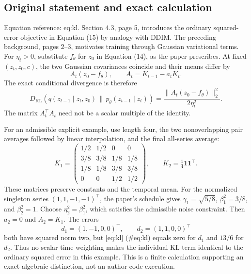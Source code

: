 \documentclass[10pt]{article}
\begin{document}
\subsection*{Original statement and exact calculation}
Equation reference: eq:kl. Section 4.3, page 5, introduces the ordinary squared-error objective in Equation (15) by analogy with DDIM. The preceding background, pages 2–3, motivates training through Gaussian variational terms. For \(\eta_t>0\), substitute \(f_\theta\) for \(z_0\) in Equation (14), as the paper prescribes. At fixed \((z_t,z_0,c)\), the two Gaussian covariances coincide and their means differ by \[A_t(z_0-f_\theta),\qquad A_t=K_{t-1}-a_tK_t.\] The exact conditional divergence is therefore \[
D_{\mathrm{KL}}\!\left(q(z_{t-1}\mid z_t,z_0)
 \,\|\,p_\theta(z_{t-1}\mid z_t)\right)
=\frac{\|A_t(z_0-f_\theta)\|_2^2}{2\eta_t^2}.\] The matrix \(A_t^\top A_t\) need not be a scalar multiple of the identity.\par
For an admissible explicit example, use length four, the two nonoverlapping pair averages followed by linear interpolation, and the final all-series average: \[K_1=\begin{pmatrix}
1/2&1/2&0&0\\3/8&3/8&1/8&1/8\\
1/8&1/8&3/8&3/8\\0&0&1/2&1/2
\end{pmatrix},
\qquad K_2=\tfrac14\mathbf1\mathbf1^\top.\] These matrices preserve constants and the temporal mean. For the normalized singleton series \((1,1,-1,-1)^\top\), the paper’s schedule gives \(\gamma_1=\sqrt{5/8}\), \(\beta_1^2=3/8\), and \(\beta_2^2=1\). Choose \(\eta_2^2=\beta_1^2\), which satisfies the admissible noise constraint. Then \(a_2=0\) and \(A_2=K_1\). The errors \[d_1=(1,-1,0,0)^\top,\qquad d_2=(1,1,0,0)^\top\] both have squared norm two, but [eq:kl] (\#eq:kl) equals zero for \(d_1\) and \(13/6\) for \(d_2\). Thus no scalar time weighting makes the individual KL term identical to the ordinary squared error in this example. This is a finite calculation supporting an exact algebraic distinction, not an author-code execution.\par
\end{document}
